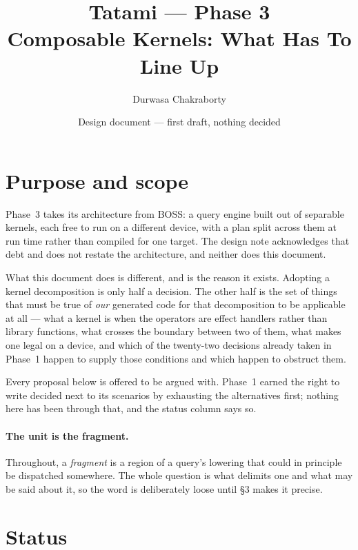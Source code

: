 \documentclass[11pt,a4paper]{article}
\title{\textbf{Tatami --- Phase 3}\\[0.3em]
       \large Composable Kernels: What Has To Line Up}
\author{Durwasa Chakraborty}
\date{Design document --- first draft, nothing decided}
\begin{document}
\maketitle

\section{Purpose and scope}

Phase~3 takes its architecture from BOSS: a query engine built out of separable
kernels, each free to run on a different device, with a plan split across them
at run time rather than compiled for one target. The design note acknowledges
that debt and does not restate the architecture, and neither does this
document.

What this document does is different, and is the reason it exists. Adopting a
kernel decomposition is only half a decision. The other half is the set of
things that must be true of \emph{our} generated code for that decomposition to
be applicable at all --- what a kernel is when the operators are effect
handlers rather than library functions, what crosses the boundary between two
of them, what makes one legal on a device, and which of the twenty-two
decisions already taken in Phase~1 happen to supply those conditions and which
happen to obstruct them.

Every proposal below is offered to be argued with. Phase~1 earned the right to
write \textsf{decided} next to its scenarios by exhausting the alternatives
first; nothing here has been through that, and the status column says so.

\paragraph{The unit is the fragment.} Throughout, a \emph{fragment} is a
region of a query's lowering that could in principle be dispatched somewhere.
The whole question is what delimits one and what may be said about it, so the
word is deliberately loose until \S3 makes it precise.

\section{Status}
\end{document}

